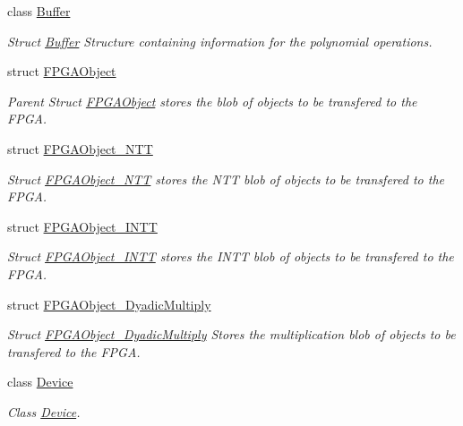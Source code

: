 \begin{DoxyCompactItemize}
class \hyperlink{classintel_1_1hexl_1_1fpga_1_1Buffer}{Buffer}
\begin{DoxyCompactList}\small\item\em Struct \hyperlink{classintel_1_1hexl_1_1fpga_1_1Buffer}{Buffer} Structure containing information for the polynomial operations. \end{DoxyCompactList}\item 
struct \hyperlink{structintel_1_1hexl_1_1fpga_1_1FPGAObject}{F\-P\-G\-A\-Object}
\begin{DoxyCompactList}\small\item\em Parent Struct \hyperlink{structintel_1_1hexl_1_1fpga_1_1FPGAObject}{F\-P\-G\-A\-Object} stores the blob of objects to be transfered to the F\-P\-G\-A. \end{DoxyCompactList}\item 
struct \hyperlink{structintel_1_1hexl_1_1fpga_1_1FPGAObject__NTT}{F\-P\-G\-A\-Object\-\_\-\-N\-T\-T}
\begin{DoxyCompactList}\small\item\em Struct \hyperlink{structintel_1_1hexl_1_1fpga_1_1FPGAObject__NTT}{F\-P\-G\-A\-Object\-\_\-\-N\-T\-T} stores the N\-T\-T blob of objects to be transfered to the F\-P\-G\-A. \end{DoxyCompactList}\item 
struct \hyperlink{structintel_1_1hexl_1_1fpga_1_1FPGAObject__INTT}{F\-P\-G\-A\-Object\-\_\-\-I\-N\-T\-T}
\begin{DoxyCompactList}\small\item\em Struct \hyperlink{structintel_1_1hexl_1_1fpga_1_1FPGAObject__INTT}{F\-P\-G\-A\-Object\-\_\-\-I\-N\-T\-T} stores the I\-N\-T\-T blob of objects to be transfered to the F\-P\-G\-A. \end{DoxyCompactList}\item 
struct \hyperlink{structintel_1_1hexl_1_1fpga_1_1FPGAObject__DyadicMultiply}{F\-P\-G\-A\-Object\-\_\-\-Dyadic\-Multiply}
\begin{DoxyCompactList}\small\item\em Struct \hyperlink{structintel_1_1hexl_1_1fpga_1_1FPGAObject__DyadicMultiply}{F\-P\-G\-A\-Object\-\_\-\-Dyadic\-Multiply} Stores the multiplication blob of objects to be transfered to the F\-P\-G\-A. \end{DoxyCompactList}\item 
class \hyperlink{classintel_1_1hexl_1_1fpga_1_1Device}{Device}
\begin{DoxyCompactList}\small\item\em Class \hyperlink{classintel_1_1hexl_1_1fpga_1_1Device}{Device}. \end{DoxyCompactList}\item 

\end{DoxyCompactItemize}
